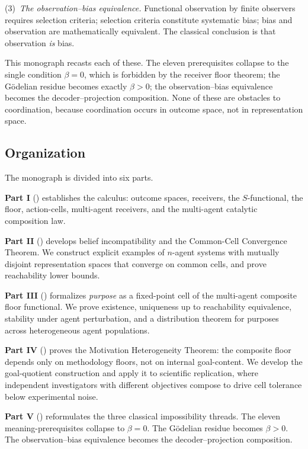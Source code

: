 \documentclass[11pt,twocolumn,a4paper]{article}
\begin{document}
(3)~\emph{The observation--bias equivalence.} Functional observation by
finite observers requires selection criteria; selection criteria
constitute systematic bias; bias and observation are mathematically
equivalent. The classical conclusion is that observation \emph{is}
bias.

This monograph recasts each of these. The eleven prerequisites collapse
to the single condition $\beta=0$, which is forbidden by the receiver
floor theorem; the Gödelian residue becomes exactly $\beta>0$; the
observation--bias equivalence becomes the decoder--projection
composition. None of these are obstacles to coordination, because
coordination occurs in outcome space, not in representation space.

\subsection{Organization}

The monograph is divided into six parts.

\textbf{Part I} ()
establishes the calculus: outcome spaces, receivers, the $S$-functional,
the floor, action-cells, multi-agent receivers, and the multi-agent
catalytic composition law.

\textbf{Part II} ()
develops belief incompatibility and the Common-Cell Convergence Theorem.
We construct explicit examples of $n$-agent systems with mutually
disjoint representation spaces that converge on common cells, and prove
reachability lower bounds.

\textbf{Part III} ()
formalizes \emph{purpose} as a fixed-point cell of the multi-agent
composite floor functional. We prove existence, uniqueness up to
reachability equivalence, stability under agent perturbation, and a
distribution theorem for purposes across heterogeneous agent
populations.

\textbf{Part IV} ()
proves the Motivation Heterogeneity Theorem: the composite floor depends
only on methodology floors, not on internal goal-content. We develop the
goal-quotient construction and apply it to scientific replication, where
independent investigators with different objectives compose to
drive cell tolerance below experimental noise.

\textbf{Part V}
()
reformulates the three classical impossibility threads. The eleven
meaning-prerequisites collapse to $\beta=0$. The Gödelian residue
becomes $\beta>0$. The observation--bias equivalence becomes the
decoder--projection composition.
\end{document}
